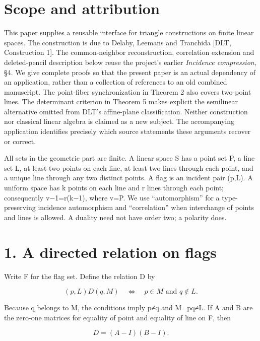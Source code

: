 


\section{Scope and attribution}\label{scope-and-attribution}

This paper supplies a reusable interface for triangle constructions on
finite linear spaces. The construction is due to Delaby, Leemans and
Tranchida {[}DLT, Construction 1{]}. The common-neighbor reconstruction,
correlation extension and deleted-pencil description below reuse the
project's earlier \emph{Incidence compression}, §4. We give
complete proofs so that the present paper is an actual dependency of an
application, rather than a collection of references to an old combined
manuscript. The point-fiber synchronization in Theorem 2 also covers
two-point lines. The determinant criterion in Theorem 5 makes explicit
the semilinear alternative omitted from DLT's affine-plane
classification. Neither construction nor classical linear algebra is
claimed as a new subject. The accompanying application identifies
precisely which source statements these arguments recover or correct.

All sets in the geometric part are finite. A linear space S has a point
set P, a line set L, at least two points on each line, at least two
lines through each point, and a unique line through any two distinct
points. A flag is an incident pair (p,L). A uniform space has k points
on each line and r lines through each point; consequently v−1=r(k−1),
where v=\textbar P\textbar. We use ``automorphism'' for a
type-preserving incidence automorphism and ``correlation'' when
interchange of points and lines is allowed. A duality need not have
order two; a polarity does.

\section{1. A directed relation on
flags}\label{a-directed-relation-on-flags}

Write F for the flag set. Define the relation D by

\[
 (p,L)D(q,M)\quad\Longleftrightarrow\quad p\in M\text{ and }q\notin L.
\tag{1}
\]

Because q belongs to M, the conditions imply p≠q and M=pq≠L. If A and B
are the zero-one matrices for equality of point and equality of line on
F, then

\[
 D=(A-I)(B-I).
\tag{2}
\]

